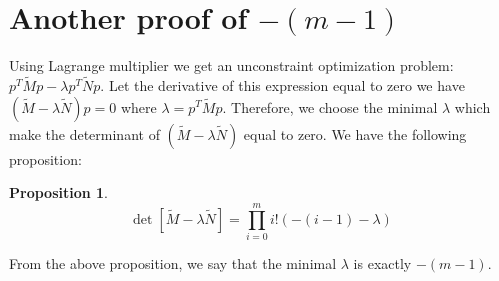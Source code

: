 \documentclass{article}
\newtheorem{proposition}{Proposition}
\begin{document}
\section{Another proof of $-(m-1)$}
Using Lagrange multiplier we get an unconstraint optimization problem:
$p^T \widetilde{M} p - \lambda p^T \widetilde{N} p $.
Let the derivative of this expression equal to zero
we have $(\widetilde{M}-\lambda \widetilde{N})p=0$ where
$\lambda = p^T \widetilde{M} p$.
Therefore, we choose the minimal $\lambda$
which make the determinant of $(\widetilde{M}-\lambda \widetilde{N})$
equal to zero.
We have the following proposition:
\begin{proposition}
\begin{equation}
\det[\widetilde{M}-\lambda \widetilde{N}] = \prod_{i=0}^m i!(-(i-1) - \lambda)
\end{equation}
\end{proposition}
From the above proposition,
we say that the minimal $\lambda$ is exactly $-(m-1)$.


\end{document}
